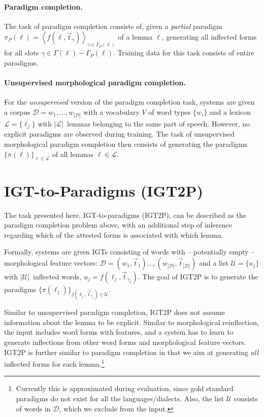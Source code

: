 \paragraph{Paradigm completion. }
The task of paradigm completion consists of, given a \textit{partial} paradigm $\pi_P(\ell) = \left\langle f(\ell, \vec{t}_\gamma)\right\rangle_{\gamma \in \Gamma_P(\ell)}$ of a lemma $\ell$, generating all inflected forms for all slots $\gamma \in \Gamma(\ell) - \Gamma_P(\ell)$.
Training data for this task consists of entire paradigms.

\paragraph{Unsupervised morphological paradigm completion. } For the \textit{unsupervised} version of the paradigm completion task, systems are given a corpus $\mathcal{D}=w_1,\dots,w_{|\mathcal{D}|}$ with a vocabulary $V$ of word types $\{w_i\}$ and a lexicon $\mathcal{L} = \{\ell_j\}$ with $|\mathcal{L}|$~lemmas belonging to the same part of speech. However, no explicit paradigms are observed during training.
The task of unsupervised morphological paradigm completion then consists of
generating the paradigms~$\{\pi(\ell)\}_{\ell\in\mathcal{L}}$ of all lemmas $\ell \in \mathcal{L}$.


\section{IGT-to-Paradigms (IGT2P)}

The task presented here, IGT-to-paradigms (IGT2P), can be described as the paradigm completion problem above, with an additional step of inference regarding which of the attested forms is associated with which lemma. 

Formally, systems are given IGTs consisting of words with -- potentially empty -- morphological feature vectors: $\mathcal{D}=(w_1,\vec{t}_1) \dots, (w_{|\mathcal{D}|}, \vec{t}_{|\mathcal{D}|})$ and a list $\mathcal{U} = \{u_j\}$ with $|\mathcal{U}|$~inflected words, $u_j = f(\ell_j, \vec{t}_{\gamma_j})$. The goal of IGT2P is to generate the paradigms 
$\{\pi(\ell_j)\}_{f(\ell_j, \vec{t}_{\gamma_j})\in\mathcal{U}}$.

Similar to  unsupervised paradigm completion, IGT2P does not assume information about the lemma to be explicit. Similar to morphological reinflection, the input includes word forms with features, and a system has to learn to generate inflections from other word forms and morphological feature vectors. 
IGT2P is further similar to paradigm completion in that we aim at generating \textit{all} inflected forms for each lemma.\footnote{Currently this is approximated during evaluation, since gold standard paradigms do not exist for all the languages/dialects. Also, the list $\mathcal{U}$ consists of words in $\mathcal{D}$, which we exclude from the input.} 


